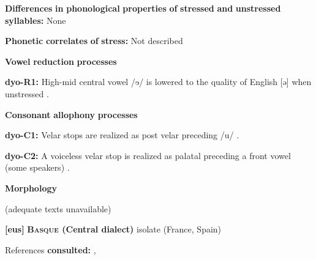 \documentclass[output=paper]{langsci/langscibook}
\begin{document}
\begin{styleBody}
\textbf{Differences} \textbf{in} \textbf{phonological} \textbf{properties} \textbf{of} \textbf{stressed} \textbf{and} \textbf{unstressed} \textbf{syllables:} None
\end{styleBody}

\begin{styleBody}
\textbf{Phonetic} \textbf{correlates} \textbf{of} \textbf{stress:} Not described
\end{styleBody}

\begin{styleBody}
\textbf{Vowel} \textbf{reduction} \textbf{processes}
\end{styleBody}

\begin{styleBody}
\textbf{dyo-R1:} High-mid central vowel /ɘ/ is lowered to the quality of English [ə] when unstressed \citep[6]{Sapir1965}.
\end{styleBody}

\begin{styleBody}
\textbf{Consonant} \textbf{allophony} \textbf{processes}
\end{styleBody}

\begin{styleBody}
\textbf{dyo-C1:} Velar stops are realized as post velar preceding /u/ \citep[5]{Sapir1965}.
\end{styleBody}

\begin{styleBody}
\textbf{dyo-C2:} A voiceless velar stop is realized as palatal preceding a front vowel (some speakers) \citep{Sapir1965}.
\end{styleBody}

\begin{styleBody}
\textbf{Morphology}
\end{styleBody}

\begin{styleBody}
(adequate texts unavailable)
\end{styleBody}

\begin{styleBody}
\textbf{[eus]}   \textbf{\textsc{Basque} \textbf{(Central} \textbf{dialect)}}  isolate (France, Spain)
\end{styleBody}

\begin{styleBody}
References \textbf{consulted:} \citet{Hualde2003}, \citet{SaltarelliEtAl1988}
\end{styleBody}
\end{document}
